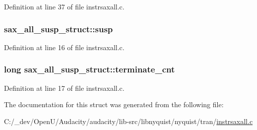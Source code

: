 Definition at line 37 of file instrsaxall.\+c.

\subsubsection[{\texorpdfstring{susp}{susp}}]{ sax\+\_\+all\+\_\+susp\+\_\+struct\+::susp}\hypertarget{structsax__all__susp__struct_a1cbaa92cd26cbf2ed2025790d6d23a0a}{}\label{structsax__all__susp__struct_a1cbaa92cd26cbf2ed2025790d6d23a0a}


Definition at line 16 of file instrsaxall.\+c.

\subsubsection[{\texorpdfstring{terminate\+\_\+cnt}{terminate_cnt}}]{\setlength{\rightskip}{0pt plus 5cm}long sax\+\_\+all\+\_\+susp\+\_\+struct\+::terminate\+\_\+cnt}\hypertarget{structsax__all__susp__struct_a3a198be8f5b934a21475d8ef9d21a2c6}{}\label{structsax__all__susp__struct_a3a198be8f5b934a21475d8ef9d21a2c6}


Definition at line 17 of file instrsaxall.\+c.



The documentation for this struct was generated from the following file\+:\begin{DoxyCompactItemize}
\item 
C\+:/\+\_\+dev/\+Open\+U/\+Audacity/audacity/lib-\/src/libnyquist/nyquist/tran/\hyperlink{instrsaxall_8c}{instrsaxall.\+c}\end{DoxyCompactItemize}
